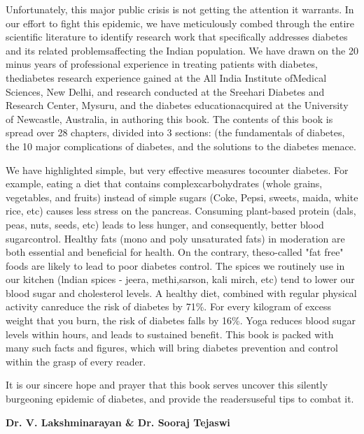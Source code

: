 Unfortunately, this major public crisis is not getting the attention it warrants. In our effort to fight this epidemic, we have meticulously combed through the entire scientific literature to identify research work that specifically addresses diabetes and its related problems\break affecting the Indian population. We have drawn on the 20 minus years of professional experience in treating patients with diabetes, the\break diabetes research experience gained at the All India Institute of\break Medical Sciences, New Delhi, and research conducted at the Sreehari Diabetes and Research Center, Mysuru, and the diabetes education\break acquired at the University of Newcastle, Australia, in authoring this book. The contents of this book is spread over 28 chapters, divided into 3 sections: (the fundamentals of diabetes, the 10 major complications of diabetes, and the solutions to the diabetes menace.

We have highlighted simple, but very effective measures to\break counter diabetes. For example, eating a diet that contains complex\break carbohydrates (whole grains, vegetables, and fruits) instead of simple sugars (Coke, Pepsi, sweets, maida, white rice, etc) causes less stress on the pancreas. Consuming plant-based protein (dals, peas, nuts, seeds, etc) leads to less hunger, and consequently, better blood sugar\break control. Healthy fats (mono and poly unsaturated fats) in moderation are both essential and beneficial for health. On the contrary, the\break so-called "fat free" foods are likely to lead to poor diabetes control. The spices we routinely use in our kitchen (lndian spices - jeera, methi,\break sarson, kali mirch, etc) tend to lower our blood sugar and cholesterol levels. A healthy diet, combined with regular physical activity can\break reduce the risk of diabetes by 71\%. For every kilogram of excess weight that you burn, the risk of diabetes falls by 16\%. Yoga reduces blood sugar levels within hours, and leads to sustained benefit. This book is packed with many such facts and figures, which will bring diabetes prevention and control within the grasp of every reader.

It is our sincere hope and prayer that this book serves uncover this silently burgeoning epidemic of diabetes, and provide the readers\break useful tips to combat it.

\begin{flushright}
\textbf{Dr. V. Lakshminarayan \& Dr. Sooraj Tejaswi}
\end{flushright}

